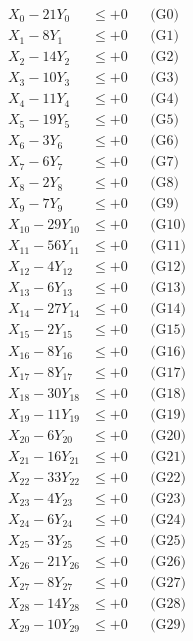 \documentclass[a4paper,10pt]{article}
\begin{document}
\allowdisplaybreaks
{\small
\begin{align}
\allowbreak
X_{0} - 21Y_{0} &\leq +0 && \text{(G0)} \\
X_{1} - 8Y_{1} &\leq +0 && \text{(G1)} \\
X_{2} - 14Y_{2} &\leq +0 && \text{(G2)} \\
X_{3} - 10Y_{3} &\leq +0 && \text{(G3)} \\
\allowbreak
X_{4} - 11Y_{4} &\leq +0 && \text{(G4)} \\
X_{5} - 19Y_{5} &\leq +0 && \text{(G5)} \\
X_{6} - 3Y_{6} &\leq +0 && \text{(G6)} \\
X_{7} - 6Y_{7} &\leq +0 && \text{(G7)} \\
X_{8} - 2Y_{8} &\leq +0 && \text{(G8)} \\
X_{9} - 7Y_{9} &\leq +0 && \text{(G9)} \\
X_{10} - 29Y_{10} &\leq +0 && \text{(G10)} \\
X_{11} - 56Y_{11} &\leq +0 && \text{(G11)} \\
X_{12} - 4Y_{12} &\leq +0 && \text{(G12)} \\
X_{13} - 6Y_{13} &\leq +0 && \text{(G13)} \\
\allowbreak
X_{14} - 27Y_{14} &\leq +0 && \text{(G14)} \\
X_{15} - 2Y_{15} &\leq +0 && \text{(G15)} \\
X_{16} - 8Y_{16} &\leq +0 && \text{(G16)} \\
X_{17} - 8Y_{17} &\leq +0 && \text{(G17)} \\
X_{18} - 30Y_{18} &\leq +0 && \text{(G18)} \\
X_{19} - 11Y_{19} &\leq +0 && \text{(G19)} \\
X_{20} - 6Y_{20} &\leq +0 && \text{(G20)} \\
X_{21} - 16Y_{21} &\leq +0 && \text{(G21)} \\
X_{22} - 33Y_{22} &\leq +0 && \text{(G22)} \\
X_{23} - 4Y_{23} &\leq +0 && \text{(G23)} \\
\allowbreak
X_{24} - 6Y_{24} &\leq +0 && \text{(G24)} \\
X_{25} - 3Y_{25} &\leq +0 && \text{(G25)} \\
X_{26} - 21Y_{26} &\leq +0 && \text{(G26)} \\
X_{27} - 8Y_{27} &\leq +0 && \text{(G27)} \\
X_{28} - 14Y_{28} &\leq +0 && \text{(G28)} \\
X_{29} - 10Y_{29} &\leq +0 && \text{(G29)} \\

\end{align}}
\end{document}
